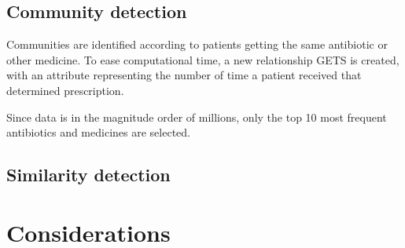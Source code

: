 \subsection{Community detection}
Communities are identified according to patients getting the same antibiotic or other medicine. To ease computational time, a new relationship GETS is created, with an attribute representing the number of time a patient received that determined prescription.

Since data is in the magnitude order of millions, only the top 10 most frequent antibiotics and medicines are selected. 

\subsection{Similarity detection}


\section{Considerations}







